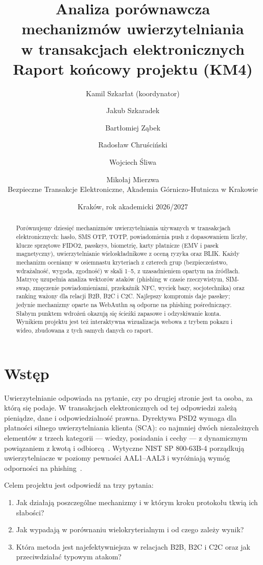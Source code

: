 \documentclass[11pt,a4paper]{article}
\title{\textbf{Analiza porównawcza mechanizmów uwierzytelniania\\w transakcjach elektronicznych}\\[6pt]\large Raport końcowy projektu (KM4)}
\author{Kamil Szkarłat (koordynator) \and Jakub Szkaradek \and Bartłomiej Ząbek \and Radosław Chruściński \and Wojciech Śliwa \and Mikołaj Mierzwa\\[8pt]
\small Bezpieczne Transakcje Elektroniczne, Akademia Górniczo-Hutnicza w Krakowie}
\date{Kraków, rok akademicki 2026/2027}
\begin{document}
\maketitle

\begin{abstract}
\noindent Porównujemy dziesięć mechanizmów uwierzytelniania używanych w transakcjach elektronicznych: hasło, SMS OTP, TOTP, powiadomienia push z dopasowaniem liczby, klucze sprzętowe FIDO2, passkeys, biometrię, karty płatnicze (EMV i pasek magnetyczny), uwierzytelnianie wieloskładnikowe z oceną ryzyka oraz BLIK. Każdy mechanizm oceniamy w osiemnastu kryteriach z czterech grup (bezpieczeństwo, wdrażalność, wygoda, zgodność) w skali 1--5, z uzasadnieniem opartym na źródłach. Matrycę uzupełnia analiza wektorów ataków (phishing w czasie rzeczywistym, SIM-swap, zmęczenie powiadomieniami, przekaźnik NFC, wyciek bazy, socjotechnika) oraz ranking ważony dla relacji B2B, B2C i C2C. Najlepszy kompromis daje passkey; jedynie mechanizmy oparte na WebAuthn są odporne na phishing pośredniczący. Słabym punktem wdrożeń okazują się ścieżki zapasowe i odzyskiwanie konta. Wynikiem projektu jest też interaktywna wizualizacja webowa z trybem pokazu i wideo, zbudowana z tych samych danych co raport.
\end{abstract}

\tableofcontents
\newpage

\section{Wstęp}

Uwierzytelnianie odpowiada na pytanie, czy po drugiej stronie jest ta osoba, za którą się podaje. W transakcjach elektronicznych od tej odpowiedzi zależą pieniądze, dane i odpowiedzialność prawna. Dyrektywa PSD2 wymaga dla płatności silnego uwierzytelniania klienta (SCA): co najmniej dwóch niezależnych elementów z trzech kategorii --- wiedzy, posiadania i cechy --- z dynamicznym powiązaniem z kwotą i odbiorcą~\cite{N3}. Wytyczne NIST SP 800-63B-4 porządkują uwierzytelniacze w poziomy pewności AAL1--AAL3 i wyróżniają wymóg odporności na phishing~\cite{N1}.

Celem projektu jest odpowiedź na trzy pytania:
\begin{enumerate}
  \item Jak działają poszczególne mechanizmy i w którym kroku protokołu tkwią ich słabości?
  \item Jak wypadają w porównaniu wielokryterialnym i od czego zależy wynik?
  \item Która metoda jest najefektywniejsza w relacjach B2B, B2C i C2C oraz jak przeciwdziałać typowym atakom?
\end{enumerate}
\end{document}
